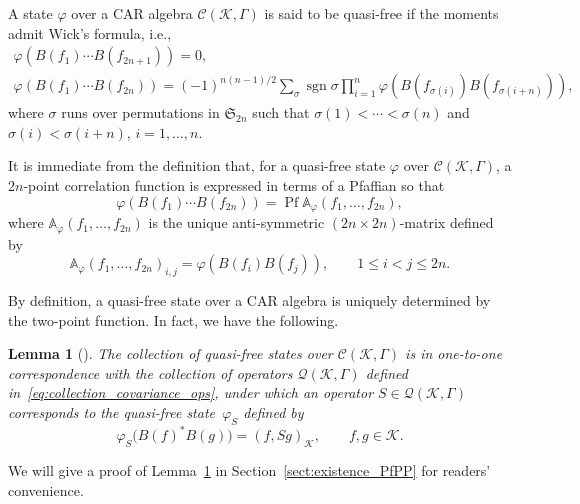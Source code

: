 \documentclass[11pt]{article}
\numberwithin{equation}{section}
\numberwithin{equation}{section}
\newtheorem{Lemma}[Theorem]{Lemma}
\newcommand{\pf}{\operatorname{Pf}}
\newcommand{\mfrak}[1]{\mathfrak{#1}}
\newcommand{\mcal}[1]{\mathcal{#1}}
\newcommand{\mbb}[1]{\mathbb{#1}}
\begin{document}
\begin{Definition}A state $\varphi$ over a CAR algebra $\mcal{C}(\mcal{K},\Gamma)$ is said to be quasi-free if the moments admit Wick's formula, i.e.,
\begin{gather*}%
	\varphi (B(f_{1})\cdots B(f_{2n+1}) ) =0, \\
	\varphi (B(f_{1})\cdots B(f_{2n}) ) =(-1)^{n(n-1)/2}\sum_{\sigma}\operatorname{sgn} \sigma \prod_{i=1}^{n}\varphi (B(f_{\sigma (i)})B(f_{\sigma (i+n)}) ),
\end{gather*}
where $\sigma$ runs over permutations in $\mfrak{S}_{2n}$ such that $\sigma(1)<\cdots<\sigma (n)$ and $\sigma (i)<\sigma (i+n)$, $i=1,\dots, n$.
\end{Definition}

It is immediate from the definition that, for a quasi-free state $\varphi$ over $\mcal{C}(\mcal{K},\Gamma)$, a $2n$-point correlation function is expressed in terms of a Pfaffian so that
\begin{equation*}
	\varphi (B(f_{1})\cdots B(f_{2n}) )=\pf \mbb{A}_{\varphi}(f_{1},\dots, f_{2n}),
\end{equation*}
where $\mbb{A}_{\varphi}(f_{1},\dots, f_{2n})$ is the unique anti-symmetric $(2n\times 2n)$-matrix defined by
\begin{equation*}
	\mbb{A}_{\varphi}(f_{1},\dots, f_{2n})_{i,j}=\varphi (B(f_{i})B(f_{j}) ),\qquad 1\le i <j \le 2n.
\end{equation*}

By definition, a quasi-free state over a CAR algebra is uniquely determined by the two-point function. In fact, we have the following.
\begin{Lemma}[\cite{Araki1970}]\label{lem:quasi-free_covariance}
The collection of quasi-free states over $\mcal{C}(\mcal{K},\Gamma)$ is in one-to-one correspondence with the collection of operators $\mcal{Q}(\mcal{K},\Gamma)$ defined in~\eqref{eq:collection_covariance_ops}, under which an operator $S\in\mcal{Q}(\mcal{K},\Gamma)$ corresponds to the quasi-free state~$\varphi_{S}$ defined by
\begin{equation*}%
	\varphi_{S}\big(B(f)^{\ast}B(g)\big)=(f,Sg)_{\mcal{K}},\qquad f,g\in\mcal{K}.
\end{equation*}
\end{Lemma}
We will give a proof of Lemma~\ref{lem:quasi-free_covariance} in Section~\ref{sect:existence_PfPP} for readers' convenience.
\end{document}
